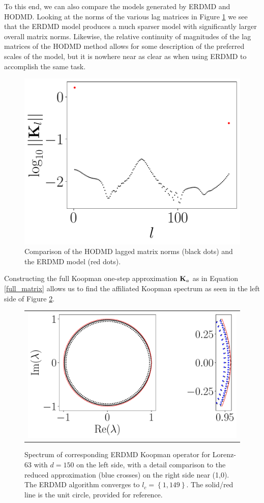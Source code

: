 \documentclass[a4paper,11pt]{article}
\begin{document}
To this end, we can also compare the models generated by ERDMD and HODMD.  Looking at the norms of the various lag matrices in Figure \ref{fig:model_comp_d_150} we see that the ERDMD model produces a much sparser model with significantly larger overall matrix norms.  Likewise, the relative continuity of magnitudes of the lag matrices of the HODMD method allows for some description of the preferred scales of the model, but it is nowhere near as clear as when using ERDMD to accomplish the same task.  
\begin{figure}[!h]
\centering
\includegraphics[width=.7\textwidth]{Lorenz_norm_full_model_149}
\caption{Comparison of the HODMD lagged matrix norms (black dots) and the ERDMD model (red dots).}
\label{fig:model_comp_d_150}
\end{figure}

Constructing the full Koopman one-step approximation ${\bf K}_{a}$ as in Equation \eqref{full_matrix} allows us to find the affiliated Koopman spectrum as seen in the left side of Figure \ref{fig:lorenz_spectrum_d_150}.  
\begin{figure}[!h]
\centering
\begin{tabular}{c}
\includegraphics[width=1\textwidth]{Lorenz_detail_spectrum_w_mx_lag_149}
\end{tabular}
\caption{Spectrum of corresponding ERDMD Koopman operator for Lorenz-63 with $d=150$ on the left side, with a detail comparison to the reduced approximation (blue crosses) on the right side near (1,0).  The ERDMD algorithm converges to $l_{c}=\left\{1,149\right\}$.  The solid/red line is the unit circle, provided for reference.}
\label{fig:lorenz_spectrum_d_150}
\end{figure}
\end{document}
